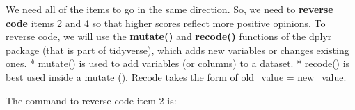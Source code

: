 \documentclass[
]{book}
\newenvironment{Shaded}{\begin{snugshade}}{\end{snugshade}}
\newcommand{\DataTypeTok}[1]{\textcolor[rgb]{0.13,0.29,0.53}{#1}}
\newcommand{\DecValTok}[1]{\textcolor[rgb]{0.00,0.00,0.81}{#1}}
\newcommand{\KeywordTok}[1]{\textcolor[rgb]{0.13,0.29,0.53}{\textbf{#1}}}
\newcommand{\NormalTok}[1]{#1}
\newcommand{\OperatorTok}[1]{\textcolor[rgb]{0.81,0.36,0.00}{\textbf{#1}}}
\newcommand{\StringTok}[1]{\textcolor[rgb]{0.31,0.60,0.02}{#1}}
\begin{document}
We need all of the items to go in the same direction. So, we need to \textbf{reverse code} items 2 and 4 so that higher scores reflect more positive opinions. To reverse code, we will use the \textbf{mutate()} and \textbf{recode()} functions of the dplyr package (that is part of tidyverse), which adds new variables or changes existing ones.
* mutate() is used to add variables (or columns) to a dataset.
* recode() is best used inside a mutate (). Recode takes the form of old\_value = new\_value.

The command to reverse code item 2 is:

\begin{Shaded}
\end{Shaded}
\end{document}
